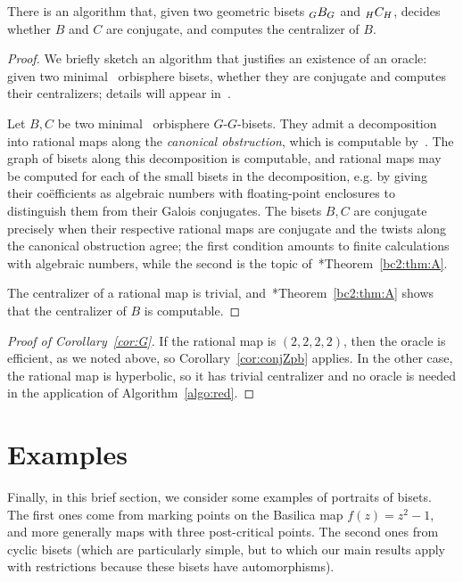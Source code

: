 \documentclass{amsart}
\begin{document}
\begin{cor}\label{cor:expdecidable}
  There is an algorithm that, given two geometric bisets
  $\subscript G B_G$ and $\subscript H C_H$, decides whether $B$ and
  $C$ are conjugate, and computes the centralizer of $B$.
\end{cor}
\begin{proof}
  We briefly sketch an algorithm that justifies an existence of an
  oracle: given two minimal \Exp\ orbisphere bisets, whether they are
  conjugate and computes their centralizers; details will appear
  in~\cite{bartholdi-dudko:bc5}.

  Let $B,C$ be two minimal \Exp\ orbisphere $G$-$G$-bisets. They admit
  a decomposition into rational maps along the \emph{canonical
    obstruction}, which is computable
  by~\cite{selinger:canonical}. The graph of bisets along this
  decomposition is computable, and rational maps may be computed for
  each of the small bisets in the decomposition, e.g. by giving their
  co\"efficients as algebraic numbers with floating-point enclosures
  to distinguish them from their Galois conjugates. The bisets $B,C$
  are conjugate precisely when their respective rational maps are
  conjugate and the twists along the canonical obstruction agree; the
  first condition amounts to finite calculations with algebraic
  numbers, while the second is the topic
  of~\cite{bartholdi-dudko:bc2}*{Theorem~\ref{bc2:thm:A}}.

  The centralizer of a rational map is trivial,
  and~\cite{bartholdi-dudko:bc2}*{Theorem~\ref{bc2:thm:A}} shows that
  the centralizer of $B$ is computable.
\end{proof}

\begin{proof}[Proof of Corollary~\ref{cor:G}]
  If the rational map is $(2,2,2,2)$, then the oracle is efficient, as
  we noted above, so Corollary~\ref{cor:conjZpb} applies. In the other
  case, the rational map is hyperbolic, so it has trivial centralizer
  and no oracle is needed in the application of
  Algorithm~\ref{algo:red}.
\end{proof}

\section{Examples}
Finally, in this brief section, we consider some examples of portraits
of bisets. The first ones come from marking points on the Basilica map
$f(z)=z^2-1$, and more generally maps with three post-critical
points. The second ones from cyclic bisets (which are particularly
simple, but to which our main results apply with restrictions because
these bisets have automorphisms).
\end{document}
